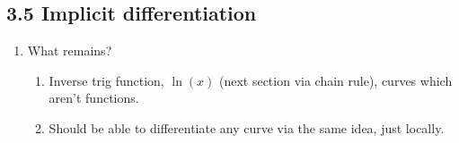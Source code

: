 \documentclass{article}
\begin{document}
\subsection{3.5 Implicit differentiation}
\begin{enumerate}

\item What remains?
\begin{enumerate}
\item Inverse trig function, $\ln(x)$ (next section via chain rule), curves which aren't functions.
\item Should be able to differentiate any curve via the same idea, just locally.
\end{enumerate}


\end{enumerate}
\end{document}
